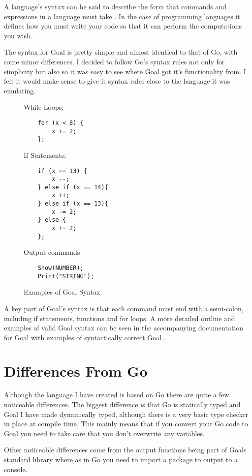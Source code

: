 A language's syntax can be said to describe the form that commands and expressions in a language must take \cite[p.~72]{CompGen1997}. In the case of programming languages it defines how you must write your code so that it can perform the computations you wish.

The syntax for Goal is pretty simple and almost identical to that of Go, with some minor differences. I decided to follow Go's syntax rules not only for simplicity but also so it was easy to see where Goal got it's functionality from. I felt it would make sense to give it syntax rules close to the language it was emulating.

\begin{figure}[h]
\centering
While Loops;
\begin{lstlisting}
	for (x < 8) {
		x += 2;
	};
\end{lstlisting}

If Statements;
\begin{lstlisting}
	if (x == 13) {
		x --;
	} else if (x == 14){
		x ++;
	} else if (x == 13){
		x -= 2;
	} else {
		x += 2;
	};
\end{lstlisting}

Output commands
\begin{lstlisting}
	Show(NUMBER);
	Print("STRING");
\end{lstlisting}

\caption{Examples of Goal Syntax}
\label{fig:egGoalSyntax} 
\end{figure}
 
A key part of Goal's syntax is that each command must end with a semi-colon, including if statements, functions and for loops. A more detailed outline and examples of valid Goal syntax can be seen in the accompanying documentation for Goal with examples of syntactically correct Goal \cite{GoalDoc}. 


\section{Differences From Go}

Although the language I have created is based on Go there are quite a few noticeable differences. The biggest difference is that Go is statically typed and Goal I have made dynamically typed, although there is a very basic type checker in place at compile time. This mainly means that if you convert your Go code to Goal you need to take care that you don't overwrite any variables.

Other noticeable differences come from the output functions being part of Goals standard library where as in Go you need to import a package to output to a console.

